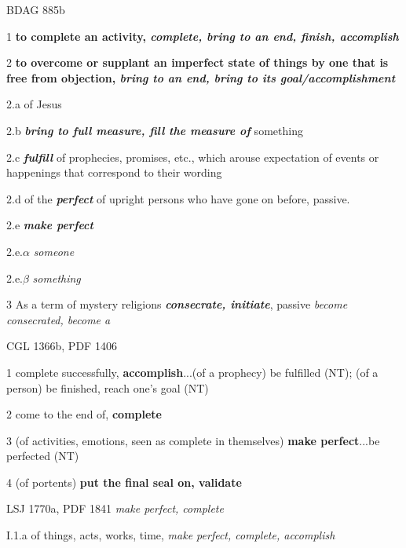 				\begin{compactdesc}
					\item[BDAG 885b] \textbf{}
						\begin{compactitem}
							\item[1] \textbf{to complete an activity, \textit{complete, bring to an end, finish, accomplish}}
							\item[2] \textbf{to overcome or supplant an imperfect state of things by one that is free from objection, \textit{bring to an end, bring to its goal/accomplishment}}
							\item[2.a] of Jesus
							\item[2.b] \textbf{\textit{bring to full measure, fill the measure of}}  something
							\item[2.c] \textbf{\textit{fulfill}} of prophecies, promises, etc., which arouse expectation of events or happenings that correspond to their wording
							\item[2.d] of the \textbf{\textit{perfect}} of upright persons who have gone on before, passive.
							\item[2.e] \textbf{\textit{make perfect}}
							\item[2.e.$\alpha$] \textit{someone}
							\item[2.e.$\beta$] \textit{something}
							\item[3] As a term of mystery religions \textbf{\textit{consecrate, initiate}}, passive \textit{become consecrated, become a}  
						\end{compactitem}
					\item[CGL 1366b, PDF 1406] \textbf{}
						\begin{compactitem}
							\item[1] complete successfully, \textbf{accomplish}...(of a prophecy) be fulfilled (NT); (of a person) be finished, reach one's goal (NT)
							\item[2] come to the end of, \textbf{complete}
							\item[3] (of activities, emotions, seen as complete in themselves) \textbf{make perfect}...be perfected (NT)
							\item[4] (of portents) \textbf{put the final seal on, validate}
						\end{compactitem}
					\item[LSJ 1770a, PDF 1841] \textit{make perfect, complete}
						\begin{compactitem}
							\item[I.1.a] of things, acts, works, time, \textit{make perfect, complete, accomplish}

\end{compactitem}
\end{compactdesc}
